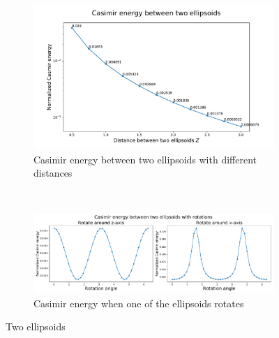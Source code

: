     \begin{figure}[H]
        \begin{subfigure}{\linewidth}
            \centering
            \includegraphics[scale = 0.5]{figures/CasE_ellipsoids.pdf}
            \caption{Casimir energy between two ellipsoids with different distances}
            \end{subfigure}\\[1ex]
    
        \begin{subfigure}{\linewidth}
        \centering
        \hspace*{-1cm}\includegraphics[scale = 0.5]{figures/CasE_ellipsoids_with_rotation.pdf}
        \caption{Casimir energy when one of the ellipsoids rotates}
        \end{subfigure}
        \caption{Two ellipsoids}
        \end{figure}

